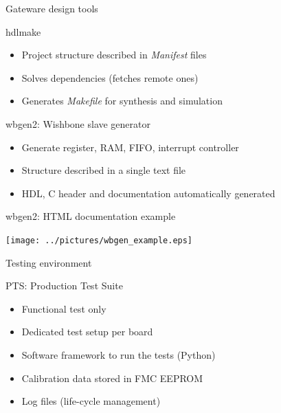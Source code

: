 \documentclass[compress,red]{beamer}
\begin{document}
\begin{frame}{Gateware design tools}

  \begin{block}{hdlmake}
    \begin{itemize}
    \item Project structure described in \textit{Manifest} files
    \item Solves dependencies (fetches remote ones)
    \item Generates \textit{Makefile} for synthesis and simulation
    \end{itemize}
  \end{block}

  \begin{block}{wbgen2: Wishbone slave generator}
    \begin{itemize}
    \item Generate register, RAM, FIFO, interrupt controller
    \item Structure described in a single text file
    \item HDL, C header and documentation automatically generated
    \end{itemize}
  \end{block}

  \note[item]{}

\end{frame}

\begin{frame}{wbgen2: HTML documentation example}

  \begin{center}
    \texttt{[image: ../pictures/wbgen\_example.eps]}
  \end{center}

  \note[item]{}

\end{frame}

\begin{frame}{Testing environment}

  \begin{block}{PTS: Production Test Suite}
    \begin{itemize}
    \item Functional test only
    \item Dedicated test setup per board
    \item Software framework to run the tests (Python)
    \item Calibration data stored in FMC EEPROM
    \item Log files (life-cycle management)
    \end{itemize}
  \end{block}



  \note[item]{}

\end{frame}
\end{document}
